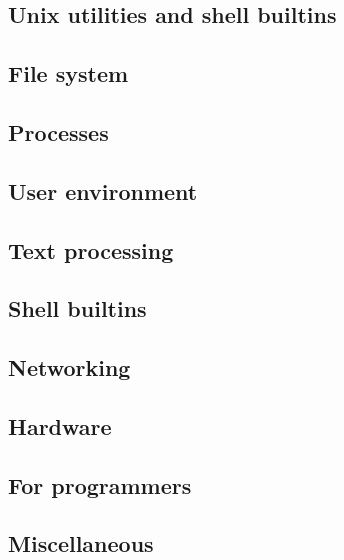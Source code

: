 \documentclass[a4paper, twoside, 8pt]{extarticle}
\begin{document}
\begin{multicols*}{3}
\section{Unix utilities and shell builtins}

\subsection{File system}


\subsection{Processes}


\subsection{User environment}


\subsection{Text processing}


\subsection{Shell builtins}


\subsection{Networking}


\subsection{Hardware}


\subsection{For programmers}


\subsection{Miscellaneous}

\end{multicols*}
\end{document}
